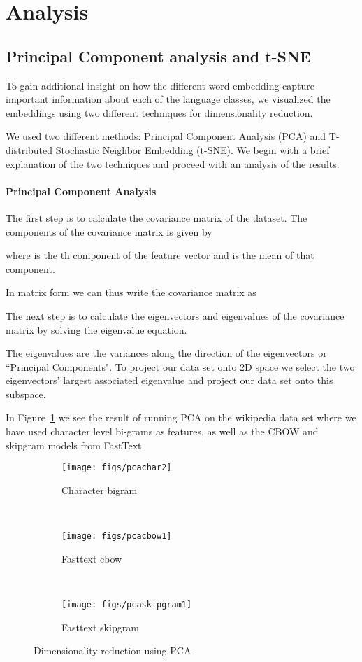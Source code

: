 \documentclass[11pt,a4paper]{article}
\begin{document}
 
\section{Analysis}

\subsection{Principal Component analysis and t-SNE}
To gain additional insight on how the different word embedding capture important information about each of the language classes, we visualized the embeddings using two different techniques for dimensionality reduction.

We used two different methods: Principal Component Analysis (PCA) and T-distributed Stochastic Neighbor Embedding (t-SNE).
We begin with a brief explanation of the two techniques and proceed with an analysis of the results.

\paragraph{Principal Component Analysis}

The first step is to calculate the covariance matrix of the dataset.
The components of the covariance matrix is given by



where  is the th component of the feature vector and  is the mean of that component.

In matrix form we can thus write the covariance matrix as

The next step is to calculate the eigenvectors and eigenvalues of the covariance matrix by solving the eigenvalue equation.

The eigenvalues are the variances along the direction of the eigenvectors or ``Principal Components". To project our data set onto 2D space we select the two eigenvectors' largest associated eigenvalue and project our data set onto this subspace.

In Figure~\ref{pca} we see the result of running  PCA  on the wikipedia data set where we have used character level bi-grams as features, as well as the CBOW and skipgram models from FastText.


\begin{figure}
    \centering
    \begin{subfigure}[b]{0.47\textwidth}
      \centering

        \texttt{[image: figs/pcachar2]}
        \caption{Character bigram}
    \end{subfigure}
    ~
    \begin{subfigure}[b]{0.47\textwidth}
          \centering
\texttt{[image: figs/pcacbow1]}
        \caption{Fasttext cbow}
    \end{subfigure}
    ~
    \begin{subfigure}[b]{0.47\textwidth}
          \centering
\texttt{[image: figs/pcaskipgram1]}
        \caption{Fasttext skipgram}
    \end{subfigure}
    \caption{Dimensionality reduction using PCA}
    \label{pca}
\end{figure}
\end{document}

